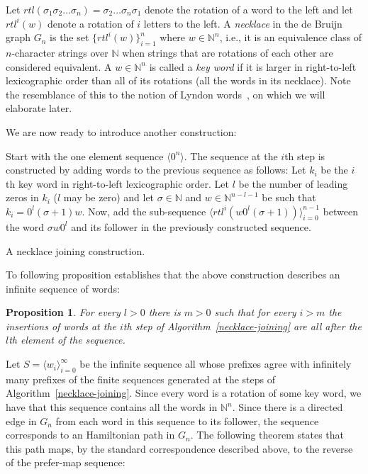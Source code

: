 \documentclass{article}
\newtheorem{proposition}[theorem]{Proposition}
\theoremstyle{definition}
\newcommand{\N}{{\mathbb{N}}}
\newcommand{\T}[1]{\langle{#1}\rangle}
\begin{document}
Let $rtl(\sigma_1\sigma_2\dots\sigma_n) = \sigma_2\dots\sigma_n\sigma_1$ denote the rotation of a word to the left and let $rtl^i(w)$ denote a rotation of $i$ letters to the left. A \emph{necklace} in the de Bruijn graph $G_n$ is the set $\{rtl^i(w)\}_{i=1}^n$ where $w \in \N^n$, i.e., it is an equivalence class of $n$-character strings over $\N$ when strings that are rotations of each other are considered equivalent. A $w\in\N^n$ is called a \emph{key word} if it is larger in right-to-left lexicographic order than all of its rotations (all the words in its necklace).  Note the resemblance of this to the notion of Lyndon words~\cite{Lyndon1954}, on which we will elaborate later.

We are now ready to introduce another construction:


\begin{algorithm}[!h]
	Start with the one element sequence $\T{0^n}$. The sequence at the $i$th step is constructed by adding words to the previous sequence as follows: Let $k_i$ be the $i$th key word in right-to-left lexicographic order. Let $l$ be the number of leading zeros in $k_i$ ($l$ may be zero) and let $\sigma \in \N$ and $w\in\N^{n-l-1}$ be such that $k_i=0^l(\sigma+1)w$. Now, add the sub-sequence $\T{rtl^i(w0^l(\sigma+1))}_{i=0}^{n-1}$ between the word $\sigma w 0^l$ and its follower in the previously constructed sequence.
	\caption{A necklace joining construction.}
	\label{necklace-joining}
\end{algorithm}

To following proposition establishes that the above construction describes an infinite sequence of words:

\begin{proposition}
	For every $l>0$ there is $m>0$ such that for every $i>m$ the insertions of words at the $i$th step of Algorithm~\ref{necklace-joining} are all after the $l$th element of the sequence.
\end{proposition}

Let $S=\T{w_i}_{i=0}^\infty$ be the infinite sequence all whose prefixes agree with infinitely many prefixes of the finite sequences generated at the steps of Algorithm~\ref{necklace-joining}. Since every word is a rotation of some key word, we have that this sequence contains all the words in $\N^n$. Since there is a directed edge in $G_n$ from each word in this sequence to its follower, the sequence corresponds to an Hamiltonian path in $G_n$. The following theorem states that this path maps, by the standard correspondence described above, to the reverse of the prefer-map sequence:
\end{document}
